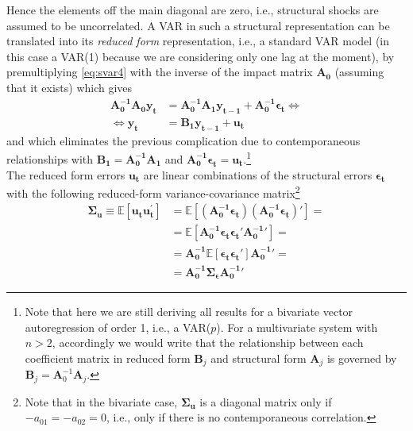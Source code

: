 \documentclass[a4paper,11pt,listof=nochaptergap,oneside,pointednumbers,bibtotoc,bigheadings,liststotoc]{scrbook}
\theoremstyle{mysatz}
\theoremstyle{mydefinition}
\theoremstyle{mybemerkung}
\newcommand{\vect}[1]{\boldsymbol{\mathbf{#1}}}
\begin{document}
Hence the elements off the main diagonal are zero, i.e., structural shocks are assumed to be uncorrelated. A VAR in such a structural representation can be translated into its \textit{reduced form} representation, i.e., a standard VAR model (in this case a VAR(1) because we are considering only one lag at the moment), by premultiplying \ref{eq:svar4} with the inverse of the impact matrix $\vect{A_0}$ (assuming that it exists) which gives
\begin{equation} \label{eq:svar5}
\begin{split}
	          \vect{A_0^{-1}}\vect{A_0}\vect{y_t} & = \vect{A_0^{-1}}\vect{A_1}\vect{y_{t-1}} + \vect{A_0^{-1}}\vect{\epsilon_t}     \iff \\
	\iff 						\vect{y_t} & = \vect{B_1}\vect{y_{t-1}} + \vect{u_t}
\end{split}								
\end{equation}
and which eliminates the previous complication due to contemporaneous relationships with $\vect{B_1} = \vect{A_0^{-1}}\vect{A_1}$ and $\vect{A_0^{-1}}\vect{\epsilon_t} = \vect{u_t}$.\footnote{Note that here we are still deriving all results for a bivariate vector autoregression of order 1, i.e., a VAR($p$). For a multivariate system with $n>2$, accordingly we would write that the relationship between each coefficient matrix in reduced form $\vect{B}_j$ and structural form $\vect{A}_j$ is governed by $\vect{B}_j = \vect{A}_0^{-1}\vect{A}_j$.}\\
The reduced form errors $\vect{u_t}$ are linear combinations of the structural errors $\vect{\epsilon_t}$ with the following reduced-form variance-covariance matrix\footnote{Note that in the bivariate case, $\vect{\Sigma_u}$ is a diagonal matrix only if $-a_{01} = -a_{02} = 0$, i.e., only if there is no contemporaneous correlation.}
\begin{equation} \label{eq:svar6}
\begin{split}
 		\vect{\Sigma_u} \equiv \mathbb{E}[\vect{u_t}\vect{u_t^'}] & = \mathbb{E}[(\vect{A_0^{-1}}\vect{\epsilon_t}) (\vect{A_0^{-1}}\vect{\epsilon_t})' ] = \\
								& = \mathbb{E}[\vect{A_0^{-1}}\vect{\epsilon_t} \vect{\epsilon_t}'\vect{A_0^{-1}}'] = \\
								& = \vect{A_0^{-1}}\mathbb{E}[\vect{\epsilon_t} \vect{\epsilon_t}']\vect{A_0^{-1}}' = \\
								& = \vect{A_0^{-1}}\vect{\Sigma_\epsilon}\vect{A_0^{-1}}'
\end{split}								
\end{equation}
\end{document}
